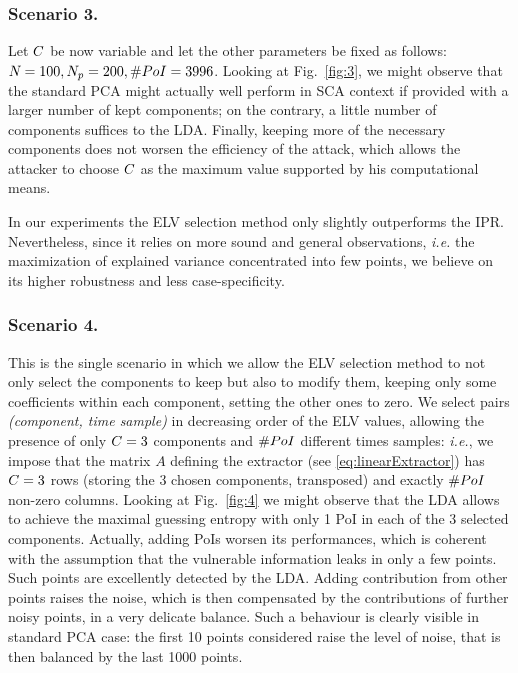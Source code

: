 \subsubsection{Scenario 3.}
Let  $\newTraceLength$ be now variable and let the other parameters be fixed as follows: $\numTraces[] = 100, N_p=200, \numPoI = 3996$. Looking at Fig.~\ref{fig:3}, we might observe that the standard PCA might actually well perform in SCA context if provided with a larger number of kept components; on the contrary, a little number of components suffices to the LDA. Finally, keeping more of the necessary components does not worsen the efficiency of the attack, which allows the attacker to choose $\newTraceLength$ as the maximum value supported by his computational means.

\begin{remark}
In our experiments the ELV selection method only slightly outperforms the IPR. Nevertheless, since it relies on more sound and general observations, {\em i.e.} the maximization of explained variance concentrated into few points, we believe on its higher robustness and less case-specificity.
\end{remark}


\subsubsection{Scenario 4.}


This is the single scenario in which we allow the ELV selection method to not only select the components to keep but also to modify them, keeping only some coefficients within each component, setting the other ones to zero. We select pairs \textit{(component, time sample)} in decreasing order of the ELV values, allowing the presence of only $\newTraceLength = 3$ components and $\numPoI$ different times samples: {\em i.e.}, we impose that the matrix $A$ defining the extractor (see \eqref{eq:linearExtractor}) has $\newTraceLength = 3$ rows (storing the 3 chosen components, transposed) and exactly $\numPoI$ non-zero columns.
Looking at Fig.~\ref{fig:4} we might observe that the LDA allows to achieve the maximal guessing entropy with only 1 PoI in each of the 3 selected components. 
Actually, adding PoIs worsen its performances, which is coherent with the assumption that the vulnerable information leaks in only a few points. Such points are excellently detected by the LDA. Adding contribution from other points raises the noise, which is then compensated by the contributions of further noisy points, in a very delicate balance. Such a behaviour is clearly visible in standard PCA case: the first 10 points considered raise the level of noise, that is then balanced by the last 1000 points.

